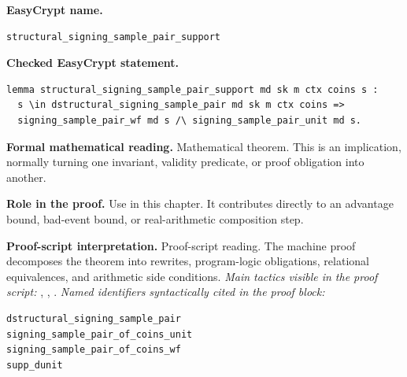 \begin{formaltheorem}
\noindent\textbf{EasyCrypt name.}
\begin{lstlisting}[language=EasyCrypt,basicstyle=\ttfamily\scriptsize]
structural_signing_sample_pair_support
\end{lstlisting}
\noindent\textbf{Checked EasyCrypt statement.}
\begin{lstlisting}[language=EasyCrypt,basicstyle=\ttfamily\scriptsize]
lemma structural_signing_sample_pair_support md sk m ctx coins s :
  s \in dstructural_signing_sample_pair md sk m ctx coins =>
  signing_sample_pair_wf md s /\ signing_sample_pair_unit md s.
\end{lstlisting}
\noindent\textbf{Formal mathematical reading.}
Mathematical theorem. This is an implication, normally turning one invariant, validity predicate, or proof obligation into another.

\noindent\textbf{Role in the proof.}
Use in this chapter. It contributes directly to an advantage bound, bad-event bound, or real-arithmetic composition step.

\noindent\textbf{Proof-script interpretation.}
Proof-script reading. The machine proof decomposes the theorem into rewrites, program-logic obligations, relational equivalences, and arithmetic side conditions.
\emph{Main tactics visible in the proof script:} , , .
\emph{Named identifiers syntactically cited in the proof block:}
\begin{lstlisting}[language=EasyCrypt,basicstyle=\ttfamily\scriptsize]
dstructural_signing_sample_pair
signing_sample_pair_of_coins_unit
signing_sample_pair_of_coins_wf
supp_dunit
\end{lstlisting}

\end{formaltheorem}

